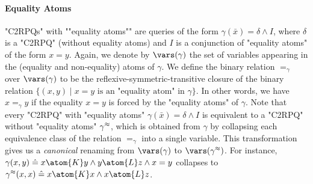 \paragraph*{Equality Atoms}
\AP"C2RPQs" with ""equality atoms"" are queries of the form $\gamma(\bar{x}) = \delta \land I$, 
where $\delta$ is a "C2RPQ" (without equality atoms) and $I$ is a conjunction of "equality atoms" of the form $x=y$. 
Again, we denote by $\vars(\gamma)$ the set of variables appearing in the (equality and non-equality) atoms of $\gamma$. 
We define the binary relation $=_\gamma$ over $\vars(\gamma)$ to be the reflexive-symmetric-transitive closure of the binary relation $\{(x, y) \mid \text{$x=y$ is an "equality atom" in $\gamma$}\}$. 
In other words, we have $x=_\gamma y$ if the equality $x=y$ is forced by the "equality atoms" of $\gamma$. 
Note that every "C2RPQ" with "equality atoms" $\gamma(\bar{x}) = \delta \land I$ is equivalent to a "C2RPQ" without "equality atoms"  $\gamma^{\approx}$, 
which is obtained from $\gamma$ by collapsing each equivalence class of the relation $=_\gamma$ into a single variable. 
This transformation gives us a \emph{canonical} renaming from $\vars(\gamma)$ to $\vars(\gamma^{\collapse})$. For instance, $\gamma(x,y) \defeq x \atom{K} y \land y \atom{L} z \land x = y$
collapses to $\gamma^{\collapse}(x,x) \defeq x \atom{K} x \land x \atom{L} z$.

